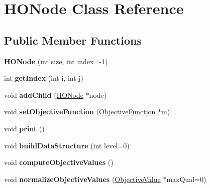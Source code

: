 \hypertarget{classHONode}{\section{H\-O\-Node Class Reference}
\label{classHONode}
}
\subsection*{Public Member Functions}
\begin{DoxyCompactItemize}
\item 
\hypertarget{classHONode_a9aede08d7bddc624967aa4507a7321e2}{{\bfseries H\-O\-Node} (int size, int index=-\/1)}\label{classHONode_a9aede08d7bddc624967aa4507a7321e2}

\item 
\hypertarget{classHONode_ab0ee2ebf84a8f000307814d8a00c08d9}{int {\bfseries get\-Index} (int i, int j)}\label{classHONode_ab0ee2ebf84a8f000307814d8a00c08d9}

\item 
\hypertarget{classHONode_adae5c176d67b8987aa1d15c34452630c}{void {\bfseries add\-Child} (\hyperlink{classHONode}{H\-O\-Node} $\ast$node)}\label{classHONode_adae5c176d67b8987aa1d15c34452630c}

\item 
\hypertarget{classHONode_a2bc5353bc6ee8a94205d750275ffc075}{void {\bfseries set\-Objective\-Function} (\hyperlink{classObjectiveFunction}{Objective\-Function} $\ast$m)}\label{classHONode_a2bc5353bc6ee8a94205d750275ffc075}

\item 
\hypertarget{classHONode_ad877ce2e3b922508dc854c485abc34cf}{void {\bfseries print} ()}\label{classHONode_ad877ce2e3b922508dc854c485abc34cf}

\item 
\hypertarget{classHONode_a3c1d16d6337081b35de83af5c743bb51}{void {\bfseries build\-Data\-Structure} (int level=0)}\label{classHONode_a3c1d16d6337081b35de83af5c743bb51}

\item 
\hypertarget{classHONode_aa92d038a2def42f2ee9cb73dfbc422da}{void {\bfseries compute\-Objective\-Values} ()}\label{classHONode_aa92d038a2def42f2ee9cb73dfbc422da}

\item 
\hypertarget{classHONode_a1f780e020ab5150d27bb04a96af13133}{void {\bfseries normalize\-Objective\-Values} (\hyperlink{classObjectiveValue}{Objective\-Value} $\ast$max\-Qual=0)}\label{classHONode_a1f780e020ab5150d27bb04a96af13133}


\end{DoxyCompactItemize}
